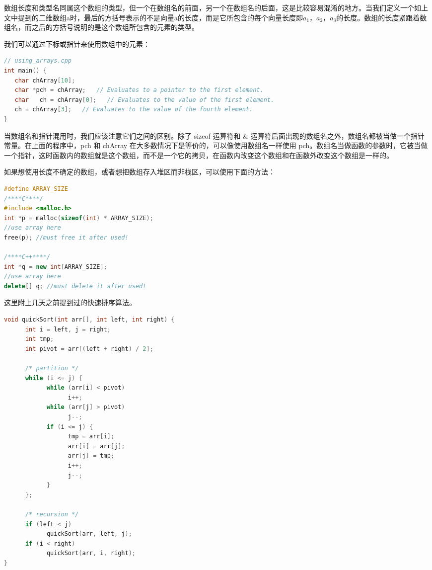 \documentclass[a4paper]{article}
\begin{document}
\begin{CJK}{UTF8}{gbsn}
数组长度和类型名同属这个数组的类型，但一个在数组名的前面，另一个在数组名的后面，这是比较容易混淆的地方。当我们定义一个如上文中提到的二维数组a时，最后的方括号表示的不是向量a的长度，而是它所包含的每个向量长度即$a_1$，$a_2$，$a_3$的长度。数组的长度紧跟着数组名，而之后的方括号说明的是这个数组所包含的元素的类型。

我们可以通过下标或指针来使用数组中的元素：

\begin{lstlisting}[language=C++]
// using_arrays.cpp
int main() {
   char chArray[10];
   char *pch = chArray;   // Evaluates to a pointer to the first element.
   char   ch = chArray[0];   // Evaluates to the value of the first element.
   ch = chArray[3];   // Evaluates to the value of the fourth element.
}
\end{lstlisting}

当数组名和指针混用时，我们应该注意它们之间的区别。除了 sizeof 运算符和 \& 运算符后面出现的数组名之外，数组名都被当做一个指针常量。在上面的程序中，pch 和 chArray 在大多数情况下是等价的，可以像使用数组名一样使用 pch。数组名当做函数的参数时，它被当做一个指针，这时函数内的数组就是这个数组，而不是一个它的拷贝，在函数内改变这个数组和在函数外改变这个数组是一样的。

如果想使用长度不确定的数组，或者想把数组存入堆区而非栈区，可以使用下面的方法：

\begin{lstlisting}[language=C++]
#define ARRAY_SIZE
/****C****/
#include <malloc.h>
int *p = malloc(sizeof(int) * ARRAY_SIZE);
//use array here
free(p); //must free it after used!

/****C++****/
int *q = new int[ARRAY_SIZE];
//use array here
delete[] q; //must delete it after used!
\end{lstlisting}

这里附上几天之前提到过的快速排序算法。
\begin{lstlisting}[language=C++]
void quickSort(int arr[], int left, int right) {
      int i = left, j = right;
      int tmp;
      int pivot = arr[(left + right) / 2];
 
      /* partition */
      while (i <= j) {
            while (arr[i] < pivot)
                  i++;
            while (arr[j] > pivot)
                  j--;
            if (i <= j) {
                  tmp = arr[i];
                  arr[i] = arr[j];
                  arr[j] = tmp;
                  i++;
                  j--;
            }
      };
 
      /* recursion */
      if (left < j)
            quickSort(arr, left, j);
      if (i < right)
            quickSort(arr, i, right);
}
\end{lstlisting}


\end{CJK}
\end{document}
